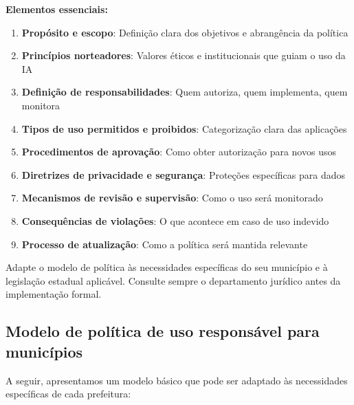 \documentclass[12pt,a4paper]{book}
\begin{document}
\textbf{Elementos essenciais:}
\begin{enumerate}
    \item \textbf{Propósito e escopo}: Definição clara dos objetivos e abrangência da política
    
    \item \textbf{Princípios norteadores}: Valores éticos e institucionais que guiam o uso da IA
    
    \item \textbf{Definição de responsabilidades}: Quem autoriza, quem implementa, quem monitora
    
    \item \textbf{Tipos de uso permitidos e proibidos}: Categorização clara das aplicações
    
    \item \textbf{Procedimentos de aprovação}: Como obter autorização para novos usos
    
    \item \textbf{Diretrizes de privacidade e segurança}: Proteções específicas para dados
    
    \item \textbf{Mecanismos de revisão e supervisão}: Como o uso será monitorado
    
    \item \textbf{Consequências de violações}: O que acontece em caso de uso indevido
    
    \item \textbf{Processo de atualização}: Como a política será mantida relevante
\end{enumerate}

\begin{tcolorbox}[dica]
Adapte o modelo de política às necessidades específicas do seu município e à legislação estadual aplicável. Consulte sempre o departamento jurídico antes da implementação formal.
\end{tcolorbox}

\subsection{Modelo de política de uso responsável para municípios}

A seguir, apresentamos um modelo básico que pode ser adaptado às necessidades específicas de cada prefeitura:
\end{document}

